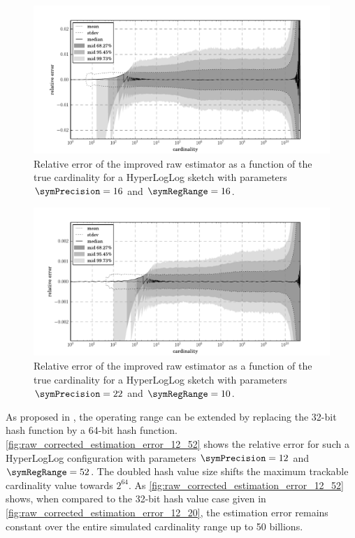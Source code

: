 \documentclass[a4paper]{scrartcl}
\begin{document}
\begin{figure}
\centering
\includegraphics[width=1\textwidth]{raw_corrected_estimate_16_16}
\caption{Relative error of the improved raw estimator as a function of the true cardinality for a HyperLogLog sketch with parameters $\symPrecision = 16$ and $\symRegRange=16$.}
\label{fig:raw_corrected_estimation_error_16_16}
\end{figure}

\begin{figure}
\centering
\includegraphics[width=1\textwidth]{raw_corrected_estimate_22_10}
\caption{Relative error of the improved raw estimator as a function of the true cardinality for a HyperLogLog sketch with parameters $\symPrecision = 22$ and $\symRegRange=10$.}
\label{fig:raw_corrected_estimation_error_22_10}
\end{figure}

As proposed in \cite{Heule2013}, the operating range can be extended by
replacing the 32-bit hash function by a 64-bit hash function. \cref{fig:raw_corrected_estimation_error_12_52} shows the relative error for such a HyperLogLog configuration with parameters $\symPrecision=12$ and $\symRegRange=52$. The doubled hash value size shifts the maximum trackable cardinality value towards $2^{64}$. As \cref{fig:raw_corrected_estimation_error_12_52} shows, when compared to the 32-bit hash value case given in \cref{fig:raw_corrected_estimation_error_12_20}, the estimation error remains constant over the entire simulated cardinality range up to 50 billions.
\end{document}
